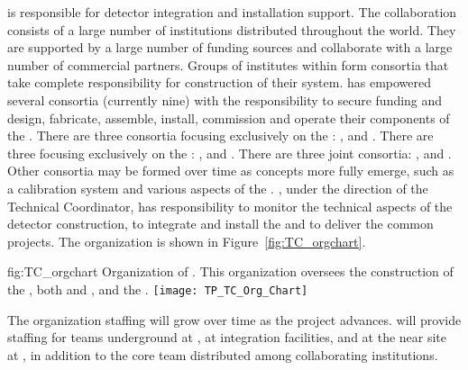  is responsible for detector integration
and installation support. 
The  collaboration consists of a large number of
institutions distributed throughout the world. They are supported by a
large number of funding sources and collaborate with a large number of
commercial partners. Groups of institutes within  form
consortia that take complete responsibility for construction of their
system.   has empowered several consortia (currently nine)
with the responsibility to secure funding and design, fabricate,
assemble, install, commission and operate their components of the
 . There are three consortia focusing
exclusively on the : ,
\single {} and \single {}. There are three
focusing exclusively on the : 
, \dual {} and \dual {}. There are
three joint consortia: ,  and . Other consortia may
be formed over time as concepts more fully emerge, such as a
 calibration system and various aspects of the .
 , under the direction of the
Technical Coordinator, has responsibility to monitor the
technical aspects of the detector construction, to integrate and
install the  and to deliver the common projects. The
  organization is shown in Figure~\ref{fig:TC_orgchart}.

\begin{dunefigure}{fig:TC_orgchart}
  {Organization of . This organization
 oversees the construction of the , both \single and
 \dual, and the .}
\texttt{[image: TP\_TC\_Org\_Chart]}
\end{dunefigure}


The  organization staffing will grow over time as the project
advances.  will provide staffing for teams underground at \surf, at
integration facilities, and at the near site at \fnal, in addition to
the core team distributed among collaborating institutions.

